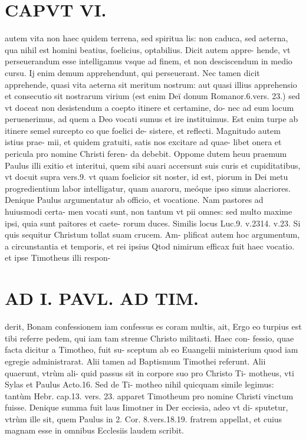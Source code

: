 \documentclass{article}
\begin{document}
\begin{pages}
\section*{CAPVT  VI. }
\marginpar{[ p.46. ]}\pstart autem vita non haec quidem terrena, sed spiritua lis: non caduca, sed aeterna, qua nihil est homini beatius, foelicius, optabilius. Dicit autem appre- hende, vt perseuerandum esse intelligamus vsque ad finem, et non desciscendum in medio cursu. Ij enim demum apprehendunt, qui perseuerant. Nec tamen dicit apprehende, quasi vita aeterna sit meritum nostrum: aut quasi illius apprehensio et consecutio sit nostrarum virium (est enim Deï donum Romanor.6.vers. 23.) sed vt doceat non desistendum a coepto itinere et certamine, do- nec ad eum locum peruenerimus, ad quem a Deo vocati sumus et ire instituimus. Est enim turpe ab itinere semel surcepto co que foelici de- sistere, et reflecti. Magnitudo autem istius prae- mii, et quidem gratuiti, satis nos excitare ad quae- libet onera et pericula pro nomine Christi feren- da debebit.  \pend\pstart Oppome dutem heuu praemum Paulus illi exitio et interitui, quem sibi auari accersunt suis curis et cupiditatibus, vt docuit supra vers.9. vt quam foelicior sit noster, id est, piorum in Dei metu progredientium labor intelligatur, quam auaroru, meóque ipso simus alacriores.  \pend\pstart Denique Paulus argumentatur ab officio, et vocatione. Nam pastores ad huiusmodi certa- men vocati sunt, non tantum vt pii omnes: sed multo maxime ipsi, quia sunt paitores et caete- rorum duces. Similis locus Luc.9. v.2314. v.23. Si quis sequitur Christum tollat suam crucem. Am- plificat autem hoc argumentum, a circunstantia et temporis, et rei ipsius Qtod nimirum efficax fuit haec vocatio. et ipse Timotheus illi respon-  \pend
\section*{AD I. PAVL. AD TIM. }
\marginpar{[ p.466 ]}\pstart derit, Bonam confessionem iam confessus es coram multis, ait, Ergo eo turpius est tibi referre pedem, qui iam tam strenue Christo militasti. Haec con- fessio, quae facta dicitur a Timotheo, fuit su- sceptum ab eo Euangelii ministerium quod iam egregie administrarat. Alii tamen ad Baptismum Timothei referunt. Alii quaerunt, vtrùm ali- quid passus sit in corpore suo pro Christo Ti- motheus, vti Sylas et Paulus Acto.16. Sed de Ti- motheo nihil quicquam simile legimus: tantùm Hebr. cap.13. vers. 23. apparet Timotheum pro nomine Christi vinctum fuisse. Denique summa fuit laus Iimotner in Der ecciesia, adeo vt di- sputetur, vtrùm ille sit, quem Paulus in 2. Cor. 8.vers.18.19. fratrem appellat, et cuius magnam esse in omnibus Ecclesiis laudem scribit.  \pend
{}
{}

\end{pages}
\end{document}
